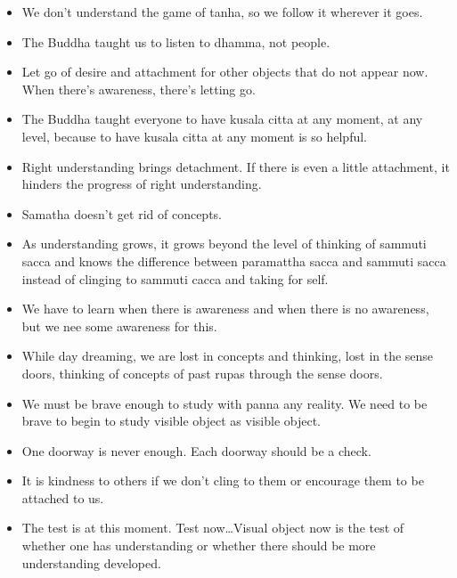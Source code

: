 \documentclass{article}
\begin{document}
\begin{itemize}
\item 
  We don't understand the game of tanha, so we follow it wherever it
  goes.

\item 
  The Buddha taught us to listen to dhamma, not people.

\item 
  Let go of desire and attachment for other objects that do not
  appear now. When there's awareness, there's letting go.

\item 
  The Buddha taught everyone to have kusala citta at any moment, at
  any level, because to have kusala citta at any moment is so
  helpful.

\item 
  Right understanding brings detachment. If there is even a little
  attachment, it hinders the progress of right understanding.

\item 
  Samatha doesn't get rid of concepts.

\item 
  As understanding grows, it grows beyond the level of thinking of
  sammuti sacca and knows the difference between paramattha sacca and
  sammuti sacca instead of clinging to sammuti cacca and taking for
  self.

\item 
  We have to learn when there is awareness and when there is no
  awareness, but we nee some awareness for this.

\item 
  While day dreaming, we are lost in concepts and thinking, lost in
  the sense doors, thinking of concepts of past rupas through the
  sense doors.

\item 
  We must be brave enough to study with panna any reality. We need to
  be brave to begin to study visible object as visible object.

\item 
  One doorway is never enough. Each doorway should be a check.

\item 
  It is kindness to others if we don't cling to them or encourage
  them to be attached to us.

\item 
  The test is at this moment. Test now\ldots{}Visual object now is
  the test of whether one has understanding or whether there should
  be more understanding developed.


\end{itemize}
\end{document}

